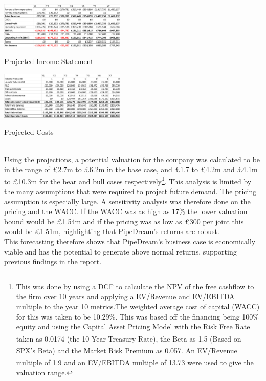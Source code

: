\documentclass[11pt]{article}		%
\newcommand{\supercite}[1]{\textsuperscript{\cite{#1}}}		%
\begin{document}
    \begin{table}[h]
					\centering
				\begin{multicols}{2}
				    
				\includegraphics[width=0.45\textwidth]{revenue projections 7 years v1.png}
					\caption{Projected Income Statement}
					\label{forecast_PL}
			
		            \columnbreak
		     
					\centering
					\includegraphics[width=0.45\textwidth]{cost projections 7 years v1.png}
					\caption{Projected Costs}
					\label{forecast_costs}
						\end{multicols}
				\end{table}
    \\
    \hspace*{2ex}Using the projections, a potential valuation for the company was calculated to be in the range of £2.7m to £6.2m in the base case, and £1.7 to £4.2m and £4.1m to £10.3m for the bear and bull cases respectively\footnote{This was done by using a DCF to calculate the NPV of the free cashflow to the firm over 10 years and applying a EV/Revenue and EV/EBITDA multiple to the year 10 metrics.The weighted average cost of capital (WACC) for this was taken to be 10.29\%. This was based off the financing being 100\% equity and using the Capital Asset Pricing Model with the Risk Free Rate taken as 0.0174 (the 10 Year Treasury Rate)\supercite{Treasury}, the Beta as 1.5 (Based on SPX’s Beta)\supercite{SPX_Beta} and the Market Risk Premium as 0.057\supercite{Risk_Premium}. An EV/Revenue multiple of 1.9 and an EV/EBITDA multiple of 13.73\supercite{SPX_multiple} were used to give the valuation range.}. This analysis is limited by the many assumptions that were required to project future demand. The pricing assumption is especially large. A sensitivity analysis was therefore done on the pricing and the WACC. If the WACC was as high as 17\% the lower valuation bound would be £1.54m and if the pricing was as low as £300 per joint this would be £1.51m, highlighting that PipeDream’s returns are robust.
  \\ 
    \hspace*{2ex}			
    This forecasting therefore shows that PipeDream's business case is economically viable and has the potential to generate above normal returns, supporting previous findings in the report.
		        	        
\end{document}
